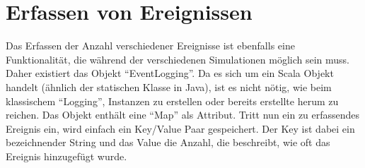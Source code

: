 \documentclass[a4paper,11pt,oneside,%
headsepline,												%
footsepline,												%
bibtotocnumbered									%
]{scrreprt}
\begin{document}
\section{Erfassen von Ereignissen}
Das Erfassen der Anzahl verschiedener Ereignisse ist ebenfalls eine Funktionalität, die während der verschiedenen Simulationen möglich sein muss. Daher existiert das Objekt \enquote{EventLogging}. Da es sich um ein Scala Objekt handelt (ähnlich der statischen Klasse in Java), ist es nicht nötig, wie beim klassischem \enquote{Logging}, Instanzen zu erstellen oder bereits erstellte herum zu reichen. Das Objekt enthält eine \enquote{Map} als Attribut. Tritt nun ein zu erfassendes Ereignis ein, wird einfach ein Key/Value Paar gespeichert. Der Key ist dabei ein bezeichnender String und das Value die Anzahl, die beschreibt, wie oft das Ereignis hinzugefügt wurde.
\end{document}
